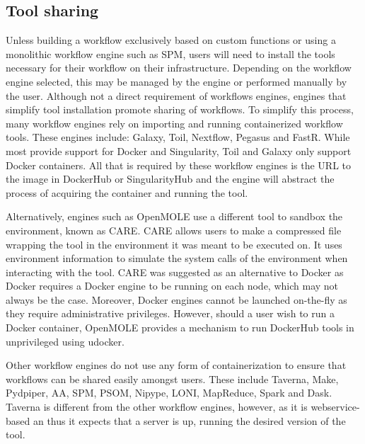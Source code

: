        \subsection{Tool sharing}\label{sharing}

            Unless building a workflow exclusively based on custom functions or
            using a monolithic workflow engine such as SPM, users will need to
            install the tools necessary for their workflow on their
            infrastructure. Depending on the workflow engine selected, this may
            be managed by the engine or performed manually by the user. Although
            not a direct requirement of workflows engines, engines that simplify
            tool installation promote sharing of workflows. To simplify this
            process, many workflow engines rely on importing and running
            containerized workflow tools. These engines include: Galaxy, Toil,
            Nextflow, Pegasus and FastR. While most provide support for Docker
            and Singularity, Toil and Galaxy only support Docker containers. All
            that is required by these workflow engines is the URL to the image
            in DockerHub or SingularityHub and the engine will abstract the
            process of acquiring the container and running the tool.

            Alternatively, engines such as OpenMOLE use a different tool to
            sandbox the environment, known as CARE. CARE allows users to make a
            compressed file wrapping the tool in the environment it was meant to
            be executed on. It uses environment information to simulate the
            system calls of the environment when interacting with the tool. CARE
            was suggested as an alternative to Docker as Docker requires a
            Docker engine to be running on each node, which may not always be
            the case. Moreover, Docker engines cannot be launched on-the-fly as
            they require administrative privileges. However, should a user wish
            to run a Docker container, OpenMOLE provides a mechanism to run
            DockerHub tools in unprivileged using udocker.

            Other workflow engines do not use any form of containerization to
            ensure that workflows can be shared easily amongst users. These
            include Taverna, Make, Pydpiper, AA, SPM, PSOM, Nipype, LONI,
            MapReduce, Spark and Dask. Taverna is different from the other
            workflow engines, however, as it is webservice-based an thus it
            expects that a server is up, running the desired version of the
            tool.

